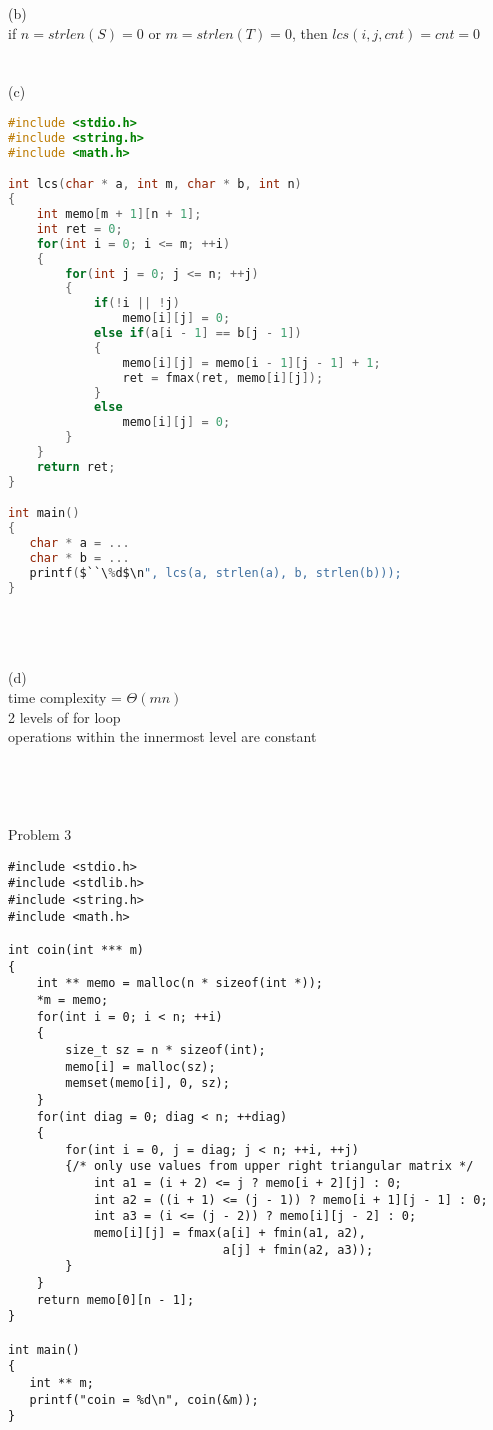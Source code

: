 \documentclass[12pt,border=4pt,multi]{article}%
\begin{document}
\newpage
\noindent
(b)\\
if $n = strlen(S) = 0$ or $m = strlen(T) = 0$, then $lcs(i, j, cnt) = cnt = 0$\\
\\
\\
(c)
\begin{lstlisting}[language = c, mathescape = true, showstringspaces=false]
#include <stdio.h>
#include <string.h>
#include <math.h>

int lcs(char * a, int m, char * b, int n)
{
    int memo[m + 1][n + 1];
    int ret = 0;
    for(int i = 0; i <= m; ++i)
    {
        for(int j = 0; j <= n; ++j)
        {
            if(!i || !j)
                memo[i][j] = 0;
            else if(a[i - 1] == b[j - 1])
            {
                memo[i][j] = memo[i - 1][j - 1] + 1;
                ret = fmax(ret, memo[i][j]);
            }
            else
                memo[i][j] = 0;
        }
    }
    return ret;
}

int main()
{
   char * a = ...
   char * b = ...
   printf($``\%d$\n", lcs(a, strlen(a), b, strlen(b)));
}
\end{lstlisting}
\\
\\
\\
(d)\\
time complexity = $\Theta(mn)$\\
2 levels of for loop\\
operations within the innermost level are constant\\
\\
\\
\\
\\
Problem 3\\
\begin{lstlisting}
#include <stdio.h>
#include <stdlib.h>
#include <string.h>
#include <math.h>

int coin(int *** m)
{
    int ** memo = malloc(n * sizeof(int *));
    *m = memo;
    for(int i = 0; i < n; ++i)
    {
        size_t sz = n * sizeof(int);
        memo[i] = malloc(sz);
        memset(memo[i], 0, sz);
    }
    for(int diag = 0; diag < n; ++diag)
    {
        for(int i = 0, j = diag; j < n; ++i, ++j)
        {/* only use values from upper right triangular matrix */
            int a1 = (i + 2) <= j ? memo[i + 2][j] : 0;
            int a2 = ((i + 1) <= (j - 1)) ? memo[i + 1][j - 1] : 0;
            int a3 = (i <= (j - 2)) ? memo[i][j - 2] : 0;
            memo[i][j] = fmax(a[i] + fmin(a1, a2),
                              a[j] + fmin(a2, a3));
        }
    }
    return memo[0][n - 1];
}

int main()
{
   int ** m;
   printf("coin = %d\n", coin(&m));
}
\end{lstlisting}
\end{document}

